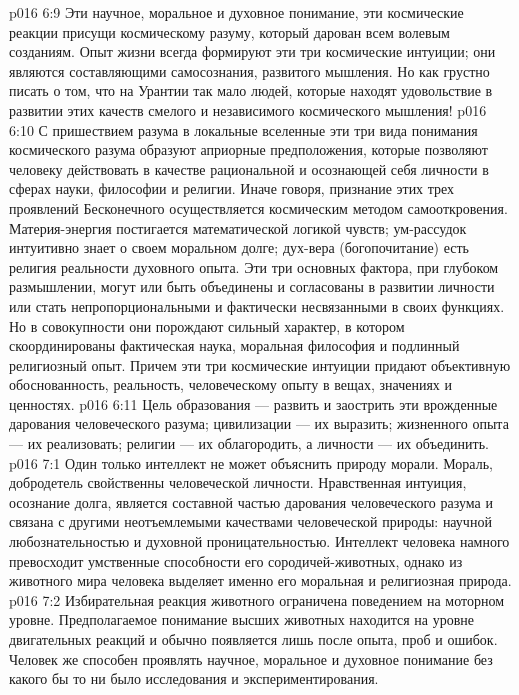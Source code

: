 \vs p016 6:9 \pc Эти научное, моральное и духовное понимание, эти космические реакции присущи космическому разуму, который дарован всем волевым созданиям. Опыт жизни всегда формируют эти три космические интуиции; они являются составляющими самосознания, развитого мышления. Но как грустно писать о том, что на Урантии так мало людей, которые находят удовольствие в развитии этих качеств смелого и независимого космического мышления!
\vs p016 6:10 \pc С пришествием разума в локальные вселенные эти три вида понимания космического разума образуют априорные предположения, которые позволяют человеку действовать в качестве рациональной и осознающей себя личности в сферах науки, философии и религии. Иначе говоря, признание  этих трех проявлений Бесконечного осуществляется космическим методом самооткровения. Материя\hyp{}энергия постигается математической логикой чувств; ум\hyp{}рассудок интуитивно знает о своем моральном долге; дух\hyp{}вера (богопочитание) есть религия реальности духовного опыта. Эти три основных фактора, при глубоком размышлении, могут или быть объединены и согласованы в развитии личности или стать непропорциональными и фактически несвязанными в своих функциях. Но в совокупности они порождают сильный характер, в котором скоординированы фактическая наука, моральная философия и подлинный религиозный опыт. Причем эти три космические интуиции придают объективную обоснованность, реальность, человеческому опыту в вещах, значениях и ценностях.
\vs p016 6:11 Цель образования --- развить и заострить эти врожденные дарования человеческого разума; цивилизации --- их выразить; жизненного опыта --- их реализовать; религии --- их облагородить, а личности --- их объединить.
\vs p016 7:1 Один только интеллект не может объяснить природу морали. Мораль, добродетель свойственны человеческой личности. Нравственная интуиция, осознание долга, является составной частью дарования человеческого разума и связана с другими неотъемлемыми качествами человеческой природы: научной любознательностью и духовной проницательностью. Интеллект человека намного превосходит умственные способности его сородичей\hyp{}животных, однако из животного мира человека выделяет именно его моральная и религиозная природа.
\vs p016 7:2 Избирательная реакция животного ограничена поведением на моторном уровне. Предполагаемое понимание высших животных находится на уровне двигательных реакций и обычно появляется лишь после опыта, проб и ошибок. Человек же способен проявлять научное, моральное и духовное понимание без какого бы то ни было исследования и экспериментирования.
